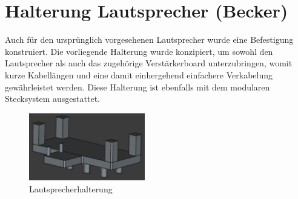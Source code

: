 \section{Halterung Lautsprecher (Becker)}

Auch für den ursprünglich vorgesehenen Lautsprecher wurde eine Befestigung konstruiert. 
Die vorliegende Halterung wurde konzipiert, um sowohl den Lautsprecher als auch das zugehörige Verstärkerboard unterzubringen, womit kurze Kabellängen und eine damit einhergehend einfachere Verkabelung gewährleistet werden. 
Diese Halterung ist ebenfalls mit dem modularen Stecksystem ausgestattet.


\begin{figure}[ht]
    \centering
    \includegraphics[width=0.45\textwidth, keepaspectratio]{images/becker_cad_speaker.png}
    \caption{Lautsprecherhalterung}
\end{figure}
